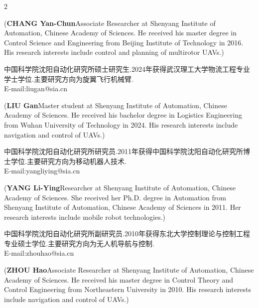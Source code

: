 \documentclass{aas}
\begin{document}
\begin{multicols}{2}
\begin{biography}
\nopagebreak
\noindent({\bf CHANG Yan-Chun}\quad Associate Researcher at Shenyang Institute of Automation, Chinese Academy of Sciences. He received his master degree in Control Science and Engineering from Beijing Institute of Technology in 2016. His research interests include control and planning of multirotor UAVs.)
\end{biography}

\begin{biography}
\samepage
{}\quad 中国科学院沈阳自动化研究所硕士研究生.2024年获得武汉理工大学物流工程专业学士学位.主要研究方向为旋翼飞行机械臂.\\E-mail:liugan@sia.cn

\nopagebreak
\noindent({\bf LIU Gan}\quad Master student at Shenyang Institute of Automation, Chinese Academy of Sciences. He received his bachelor degree in Logistics Engineering from Wuhan University of Technology in 2024. His research interests include navigation and control of UAVs.)
\end{biography}

\begin{biography}
\samepage
{}\quad 中国科学院沈阳自动化研究所研究员.2011年获得中国科学院沈阳自动化研究所博士学位.主要研究方向为移动机器人技术.\\E-mail:yangliying@sia.cn

\nopagebreak
\noindent({\bf YANG Li-Ying}\quad Researcher at Shenyang Institute of Automation, Chinese Academy of Sciences. She received her Ph.D. degree in Automation from Shenyang Institute of Automation, Chinese Academy of Sciences in 2011. Her research interests include mobile robot technologies.)
\end{biography}

\begin{biography}
\samepage
{}\quad 中国科学院沈阳自动化研究所副研究员.2010年获得东北大学控制理论与控制工程专业硕士学位.主要研究方向为无人机导航与控制.\\E-mail:zhouhao@sia.cn

\nopagebreak
\noindent({\bf ZHOU Hao}\quad Associate Researcher at Shenyang Institute of Automation, Chinese Academy of Sciences. He received his master degree in Control Theory and Control Engineering from Northeastern University in 2010. His research interests include navigation and control of UAVs.)
\end{biography}


\end{multicols}
\end{document}
